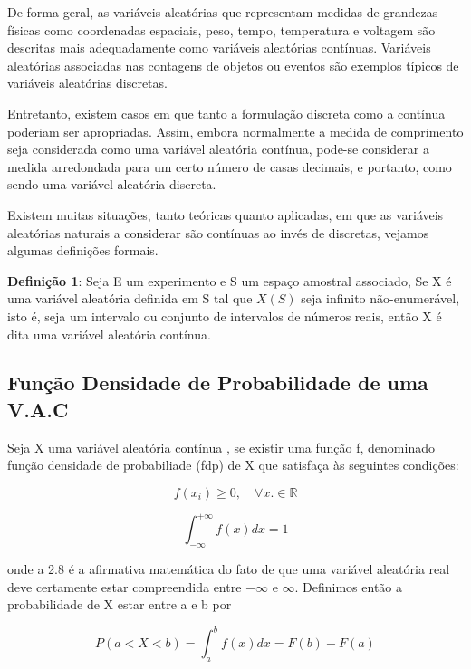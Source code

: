 \documentclass[a4paper,12pt]{report}
\begin{document}
{De forma geral, as variáveis aleatórias que representam medidas de
grandezas físicas como coordenadas espaciais, peso, tempo,
temperatura e voltagem são descritas mais adequadamente como
variáveis aleatórias contínuas. Variáveis aleatórias associadas
nas contagens de objetos ou eventos são exemplos típicos de
variáveis aleatórias discretas.\vskip0.3cm

Entretanto, existem casos em que tanto a formulação discreta como
a contínua poderiam ser apropriadas. Assim, embora normalmente a
medida de comprimento seja considerada como uma variável aleatória
contínua, pode-se considerar a medida arredondada para um certo
número de casas decimais, e portanto, como sendo uma variável
aleatória discreta.\vskip0.3cm


Existem muitas situações, tanto teóricas quanto aplicadas, em que
as variáveis aleatórias naturais a considerar são contínuas ao
invés de discretas, vejamos algumas definições formais.\vskip0.3cm


\textbf{Definição 1}: Seja E um experimento e S um espaço amostral
associado, Se X é uma variável aleatória definida em S tal que
$X(S)$ seja infinito não-enumerável, isto é, seja um intervalo ou
conjunto de intervalos de números reais, então X é dita uma
variável aleatória contínua.



\subsection{Função Densidade de Probabilidade de uma V.A.C}

Seja X uma variável aleatória contínua , se existir uma função f,
denominado função densidade de probabiliade (fdp) de X que
satisfaça às seguintes condições:


\begin{equation}\label{}
    f(x_{i}) \geq 0, \quad \forall x.\in \mathbb{R}
\end{equation}


\begin{equation}\label{}
    \int^{+\infty}_{-\infty}f(x)dx=1
\end{equation}

onde a 2.8 é a afirmativa matemática do fato de que uma variável
aleatória real deve certamente estar compreendida entre $-\infty$
e $\infty$. Definimos então a probabilidade de X estar entre a e b
por

\begin{equation}\label{}
    P(a< X < b)=\int_{a}^{b}f(x)dx = F(b)-F(a)
\end{equation}



}
\end{document}
